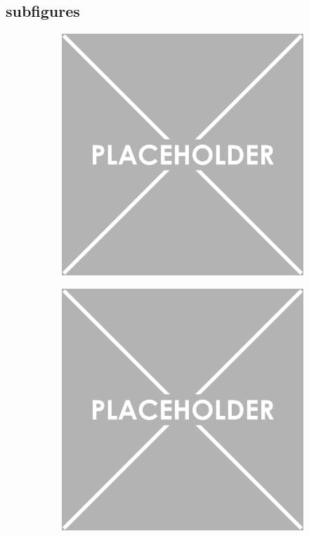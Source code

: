 \documentclass{article}
\begin{document}
\subsection{subfigures}

		\begin{figure}[H]
			\begin{subfigure}[b]{0.5\textwidth}
				\centering
				\includegraphics[width=\textwidth]{Figures/Example}
			\end{subfigure}
			\hfill
			\begin{subfigure}[b]{0.5\textwidth}
				\centering
				\includegraphics[width=\textwidth]{Figures/Example}

\end{subfigure}
\end{figure}
\end{document}
